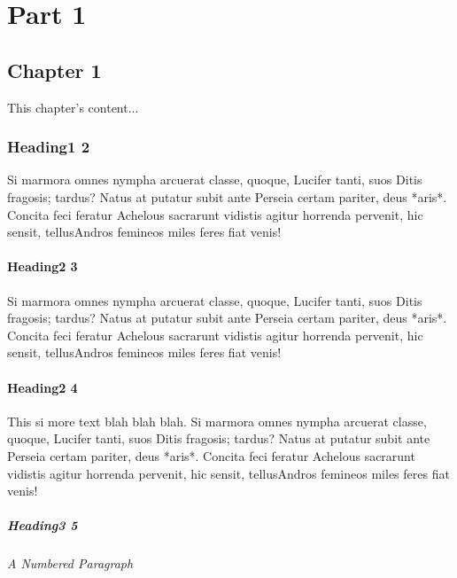 \part{Part 1}

\chapter{Chapter 1}

This chapter's content...

\section{Heading1 2}

Si marmora omnes nympha arcuerat classe, quoque, Lucifer tanti, suos Ditis
fragosis; tardus? Natus at putatur subit ante Perseia certam pariter, deus
*aris*. Concita feci feratur Achelous sacrarunt vidistis agitur horrenda
pervenit, hic sensit, tellusAndros femineos miles feres fiat venis!

\subsection{Heading2 3}

Si marmora omnes nympha arcuerat classe, quoque, Lucifer tanti, suos Ditis
fragosis; tardus? Natus at putatur subit ante Perseia certam pariter, deus
*aris*. Concita feci feratur Achelous sacrarunt vidistis agitur horrenda
pervenit, hic sensit, tellusAndros femineos miles feres fiat venis!

\subsection{Heading2 4}

This si more text blah blah blah.
Si marmora omnes nympha arcuerat classe, quoque, Lucifer tanti, suos Ditis
fragosis; tardus? Natus at putatur subit ante Perseia certam pariter, deus
*aris*. Concita feci feratur Achelous sacrarunt vidistis agitur horrenda
pervenit, hic sensit, tellusAndros femineos miles feres fiat venis!

\subsubsection{Heading3 5}

\paragraph{A Numbered Paragraph}

